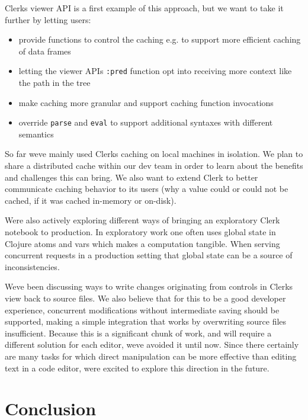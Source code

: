 \documentclass[sigconf,screen,pbalance=true]{acmart}
\newcommand{\passthrough}[1]{#1}
\providecommand{\tightlist}{%
  \setlength{\itemsep}{0pt}\setlength{\parskip}{0pt}}
\begin{document}
Clerk\textquotesingle s viewer API is a first example of this approach, but we want to take it further by letting users:

\begin{itemize}
\tightlist
\item
  provide functions to control the caching e.g. to support more efficient caching of data frames
\item
  letting the viewer API\textquotesingle s \passthrough{\lstinline!:pred!} function opt into receiving more context like the path in the tree
\item
  make caching more granular and support caching function invocations
\item
  override \passthrough{\lstinline!parse!} and \passthrough{\lstinline!eval!} to support additional syntaxes with different semantics
\end{itemize}

So far we\textquotesingle ve mainly used Clerk\textquotesingle s caching on local machines in isolation. We plan to share a distributed cache within our dev team in order to learn about the benefits and challenges this can bring. We also want to extend Clerk to better communicate caching behavior to its users (why a value could or could not be cached, if it was cached in-memory or on-disk).

We\textquotesingle re also actively exploring different ways of bringing an exploratory Clerk notebook to production. In exploratory work one often uses global state in Clojure atoms and vars which makes a computation tangible. When serving concurrent requests in a production setting that global state can be a source of inconsistencies.

We\textquotesingle ve been discussing ways to write changes originating from controls in Clerk\textquotesingle s view back to source files. We also believe that for this to be a good developer experience, concurrent modifications without intermediate saving should be supported, making a simple integration that works by overwriting source files insufficient. Because this is a significant chunk of work, and will require a different solution for each editor, we\textquotesingle ve avoided it until now. Since there certainly are many tasks for which direct manipulation can be more effective than editing text in a code editor, we\textquotesingle re excited to explore this direction in the future.

\hypertarget{conclusion}{%
\section{Conclusion}\label{conclusion}}
\end{document}
